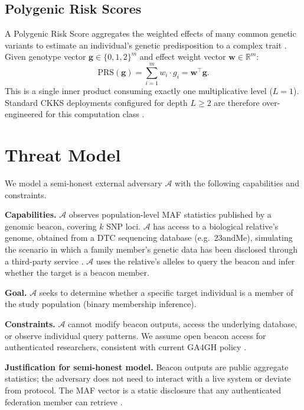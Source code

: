 \documentclass[conference]{IEEEtran}
\begin{document}
\subsection{Polygenic Risk Scores}

A Polygenic Risk Score aggregates the weighted effects of many common genetic
variants to estimate an individual's genetic predisposition to a complex trait
\cite{weitzel2011}. Given genotype vector $\mathbf{g}\in\{0,1,2\}^m$ and
effect weight vector $\mathbf{w}\in\mathbb{R}^m$:
\begin{equation}
    \text{PRS}(\mathbf{g}) = \sum_{i=1}^{m} w_i \cdot g_i = \mathbf{w}^\top\mathbf{g}.
    \label{eq:prs}
\end{equation}
This is a single inner product consuming exactly one multiplicative level
($L=1$). Standard CKKS deployments configured for depth $L\geq2$ are therefore
over-engineered for this computation class \cite{blatt2020,cheon2019}.

\section{Threat Model}

We model a semi-honest external adversary $\mathcal{A}$ with the following
capabilities and constraints.

\textbf{Capabilities.} $\mathcal{A}$ observes population-level MAF statistics
published by a genomic beacon, covering $k$ SNP loci. $\mathcal{A}$ has access
to a biological relative's genome, obtained from a DTC sequencing database
(e.g.\ 23andMe), simulating the scenario in which a family member's genetic
data has been disclosed through a third-party service \cite{gymrek2013,
erlich2014}. $\mathcal{A}$ uses the relative's alleles to query the beacon and
infer whether the target is a beacon member.

\textbf{Goal.} $\mathcal{A}$ seeks to determine whether a specific target
individual is a member of the study population (binary membership inference).

\textbf{Constraints.} $\mathcal{A}$ cannot modify beacon outputs, access the
underlying database, or observe individual query patterns. We assume open
beacon access for authenticated researchers, consistent with current GA4GH
policy \cite{stark2025}.

\textbf{Justification for semi-honest model.} Beacon outputs are public
aggregate statistics; the adversary does not need to interact with a live
system or deviate from protocol. The MAF vector is a static disclosure that
any authenticated federation member can retrieve \cite{shringarpure2015,
raisaro2017}.
\end{document}
